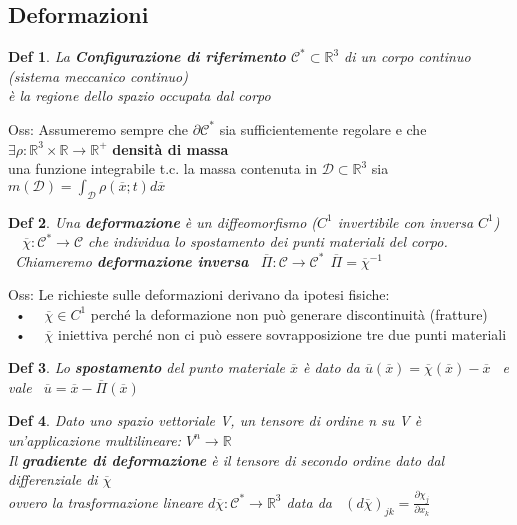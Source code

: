 \documentclass{article}
\theoremstyle{unnumbered}
\newtheorem* {theoremT}{Def}
\theoremstyle{unnumbered1}
\newenvironment{defi}{\begin{gBox}\begin{theoremT}}{\end{theoremT}\end{gBox}}
\begin{document}
\subsection{Deformazioni}
%
\begin{defi}
La \textbf{Configurazione di riferimento} $\mathcal{C}^*\subset \mathbb{R}^3$ di un corpo continuo (sistema meccanico continuo)\\
\phantom{DEF. } è la regione dello spazio occupata dal corpo
\end{defi}
%
Oss: Assumeremo sempre che $\partial \mathcal{C}^*$ sia sufficientemente regolare e che $\exists\rho : \mathbb{R}^3\times\mathbb{R}\rightarrow\mathbb{R}^+$ \textbf{densità di massa}\\
\phantom{Oss: }una funzione integrabile t.c.\! la massa contenuta in $\mathcal{D}\subset\mathbb{R}^3$ sia \ $m(\mathcal{D})=\int_{\mathcal{D}}\rho(\overline{x};t)d\overline{x}$ \\
%
%
%
\begin{defi}
Una \textbf{deformazione} è un diffeomorfismo ($C^1$ invertibile con inversa $C^1$) \ \ $ \overline{\chi}: \mathcal{C}^*\rightarrow \mathcal{C}$ che individua lo spostamento dei punti materiali del corpo. \
Chiameremo \textbf{deformazione inversa} \ $\overline{\Pi}:\mathcal{C}\rightarrow\mathcal{C}^*\ \ \overline{\Pi}=\overline{\chi}^{-1}$
\end{defi}
%
Oss: Le richieste sulle deformazioni derivano da ipotesi fisiche:\\
\ • \ \ $\overline{\chi} \in C^1$ perché la deformazione non può generare discontinuità (fratture)\\
\ • \ \ $\overline{\chi}$ iniettiva perché non ci può essere sovrapposizione tre due punti materiali
%
\begin{defi}
Lo \textbf{spostamento} del punto materiale $\overline{x}$ è dato da $\overline{u}(\overline{x})=\overline{\chi}(\overline{x})-\overline{x}$ \ e vale \ $\overline{u}=\overline{x}-\overline{\Pi}(\overline{x})$\end{defi}
%
%
%
\begin{defi}
Dato uno spazio vettoriale V, un tensore di ordine n su V è un’applicazione multilineare: $V^n \rightarrow \mathbb{R}$ \\
Il \textbf{gradiente di deformazione} è il tensore di secondo ordine dato dal differenziale di $\overline{\chi}$\\ ovvero la trasformazione lineare $d\overline{\chi}:\mathcal{C}^*\rightarrow\mathbb{R}^3 $ data da \ $(d\overline{\chi})_{jk}=\frac{\partial\chi_j}{\partial x_k}$
\end{defi}
\end{document}
